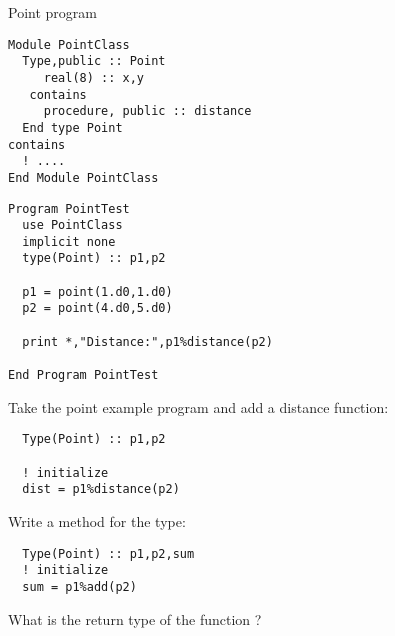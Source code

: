 \begin{block}{Point program}
  \label{sl:fpoint-program}
  \footnotesize
  
  \begin{multicols}{2}
\begin{verbatim}
Module PointClass
  Type,public :: Point
     real(8) :: x,y
   contains
     procedure, public :: distance
  End type Point
contains
  ! ....
End Module PointClass
\end{verbatim}
\columnbreak
\begin{verbatim}
Program PointTest
  use PointClass
  implicit none
  type(Point) :: p1,p2

  p1 = point(1.d0,1.d0)
  p2 = point(4.d0,5.d0)

  print *,"Distance:",p1%distance(p2)

End Program PointTest
\end{verbatim}
  \end{multicols}  
\end{block}

\begin{exercise}
  \label{ex:fclass-point-distance}
  Take the point example program and add a distance function:
\begin{verbatim}
  Type(Point) :: p1,p2
  
  ! initialize
  dist = p1%distance(p2)
\end{verbatim}
\end{exercise}

\begin{exercise}
  \label{ex:fclass-translate}
  Write a method  for the  type:
\begin{verbatim}
  Type(Point) :: p1,p2,sum
  ! initialize
  sum = p1%add(p2)
\end{verbatim}
  What is the return type of the function ?
\end{exercise}

\endinput

\begin{block}{Use modules!}
  \label{sl:fclass-module}
   It is of course best to put the type definition and method
   definitions in a module, so that you can \n{use} it.

   Mark methods as \n{private} so that they can only be used as part
   of the \n{type}:

   \verbatimsnippet{classmodule}
\end{block}

